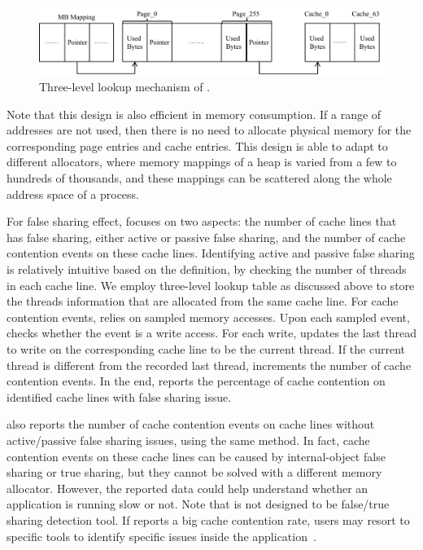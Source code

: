 \begin{figure}[!h]
\centering
\includegraphics[width=\columnwidth]{figures/lookup}
\caption{Three-level lookup mechanism of \MP{}.\label{fig:lookup}}
\end{figure}

Note that this design is also efficient in memory consumption. If a range of addresses are not used, then there is no need to allocate physical memory for the corresponding page entries and cache entries. This design is able to adapt to different allocators, where memory mappings of a heap is varied from a few to hundreds of thousands, and these mappings can be scattered along the whole address space of a process. 

For false sharing effect, \MP{} focuses on two aspects: the number of cache lines that has false sharing, either active or passive false sharing, and the number of cache contention events on these cache lines. Identifying active and passive false sharing is relatively intuitive based on the definition, by checking the number of threads in each cache line. We employ three-level lookup table as discussed above to store the threads information that are allocated from the same cache line. 
For cache contention events, \MP{} relies on sampled memory accesses. Upon each sampled event, \MP{} checks whether the event is a write access. For each write, \MP{} updates the last thread to write on the corresponding cache line to be the current thread. If the current thread is different from the recorded last thread, \MP{} increments the number of cache contention events. In the end, \MP{} reports the percentage of cache contention on identified cache lines with false sharing issue. 

\MP{} also reports the number of cache contention events on cache lines without active/passive false sharing issues, using the same method. In fact, cache contention events on these cache lines can be caused by internal-object false sharing or true sharing, but they cannot be solved with a different memory allocator. However, the reported data could help understand whether an application is running slow or not. Note that \MP{} is not designed to be false/true sharing detection tool. If \MP{} reports a big cache contention rate, users may resort to specific tools to identify specific issues inside the application~\cite{Sheriff, Predator, DBLP:conf/ppopp/ChabbiWL18}. 
   

